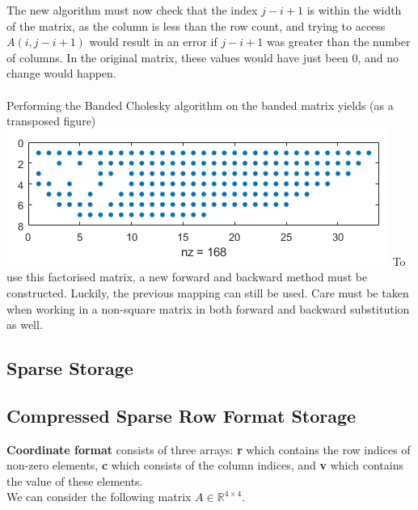 \documentclass[12pt,a4paper]{article}
\begin{document}
The new algorithm must now check that the index $j-i+1$ is within the width of the matrix, as the column is less than the row count, and trying to access $A(i,j-i+1)$ would result in an error if $j-i+1$ was greater than the number of columns. In the original matrix, these values would have just been 0, and no change would happen.\\\\Performing the Banded Cholesky algorithm on the banded matrix yields (as a transposed figure) \\\includegraphics{images/cholband.png}
To use this factorised matrix, a new forward and backward method must be constructed. Luckily, the previous mapping can still be used. Care must be taken when working in a non-square matrix in both forward and backward substitution as well.
\subsection{Sparse Storage}

\subsection{Compressed Sparse Row Format Storage}
\textbf{Coordinate format} consists of three arrays: \textbf{r} which contains the row indices of non-zero elements, \textbf{c} which consists of the column indices, and \textbf{v} which contains the value of these elements.
\\
We can consider the following matrix $A \in \mathbb{R}^{4 \times 4}$.
\end{document}
